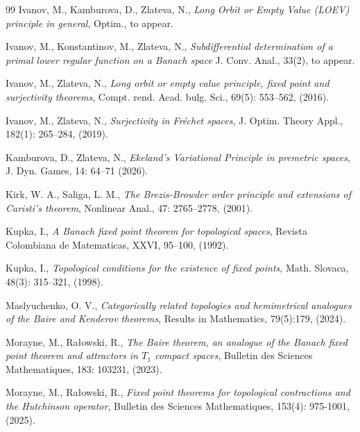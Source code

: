 \documentclass{article}
\begin{document}
\begin{thebibliography}{99}
 Ivanov, M., Kamburova, D., Zlateva, N., \textit{Long Orbit or Empty Value (LOEV) principle in general}, Optim., to appear.

Ivanov, M., Konstantinov, M., Zlateva, N., \textit{ Subdifferential determination of a primal lower regular function on a Banach space} J. Conv. Anal., 33(2), to appear.

Ivanov, M., Zlateva, N.,  \textit{Long orbit or empty value principle, fixed point and surjectivity theorems}, Compt. rend. Acad. bulg. Sci., 69(5): 553--562, (2016).


Ivanov, M., Zlateva, N., \textit{Surjectivity in Fr\'echet spaces}, J. Optim. Theory Appl., 182(1): 265--284, (2019).




 Kamburova, D., Zlateva, N., \textit{Ekeland's Variational Principle in premetric spaces}, J. Dyn. Games, 14: 64--71 (2026).

Kirk, W. A., Saliga, L. M., \textit{The Brezis-Browder order principle and extensions of Caristi's theorem},
Nonlinear Anal., 47: 2765--2778, (2001).

 Kupka, I., \textit{A Banach fixed point theorem for topological spaces}, Revista Colombiana de Matematicas, XXVI, 95--100, (1992).

 Kupka, I., \textit{Topological conditions for the existence of fixed points}, Math. Slovaca, 48(3): 315--321, (1998).


Maslyuchenko, O. V., \textit{Categorically related topologies and hemimetrical analogues of the Baire and Kenderov theorems}, Results in Mathematics, 79(5):179, (2024).

 Morayne, M., Rałowski, R., \textit{The Baire theorem, an analogue of the Banach fixed point theorem and attractors in $T_1$ compact spaces}, Bulletin des Sciences Mathematiques, 183: 103231, (2023).

Morayne, M., Rałowski, R., \textit{Fixed point theorems for topological contractions and the Hutchinson operator}, Bulletin des Sciences Mathematiques, 153(4): 975-1001, (2025).


\end{thebibliography}
\end{document}
